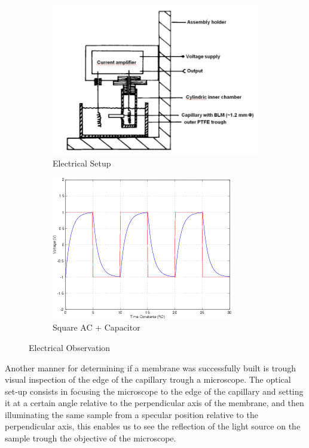 \documentclass[a4paper,english,12pt,bibliography=totoc]{scrreprt}
\begin{document}
\begin{figure}[H]
\centering
\begin{subfigure}{.5\textwidth}
  \centering
  \includegraphics[width=.9\linewidth]{electrical setup.png}
  \caption{Electrical Setup}
  \label{fig:sub1}
\end{subfigure}%
\begin{subfigure}{.5\textwidth}
  \centering
  \includegraphics[width=.9\linewidth]{Square voltage + capacitor.png}
  \caption{Square AC + Capacitor}
  \label{fig:sub2}
\end{subfigure}
\caption{Electrical Observation}
\label{fig:test}
\end{figure}

Another manner for determining if a membrane was successfully built is trough visual inspection of the edge of the capillary trough a microscope. The optical set-up consists in focusing the microscope to the edge of the capillary and setting it at a certain angle relative to the perpendicular axis of the membrane, and then illuminating the same sample from a specular position relative to the perpendicular axis, this enables us to see the reflection of the light source on the sample trough the objective of the microscope.
\end{document}
